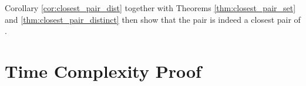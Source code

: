\begin{isabellebody}
\begin{isamarkuptext}
Corollary \ref{cor:closest_pair_dist} together with Theorems \ref{thm:closest_pair_set} and
\ref{thm:closest_pair_distinct} then show that the pair  is indeed a closest pair of .

\begin{corollary} \label{cor:closest_pair_dist}
 \vskip 0pt
\end{corollary}


\begin{theorem} \label{thm:closest_pair_set}
 \vskip 0pt
\end{theorem}

\begin{theorem} \label{thm:closest_pair_distinct}
 \vskip 0pt
\end{theorem}


\section{Time Complexity Proof} \label{section:proving_running_time}


\end{isamarkuptext}
\end{isabellebody}
